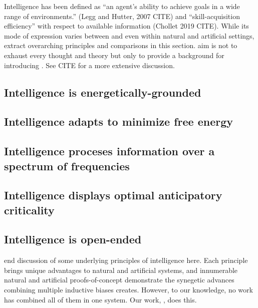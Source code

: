 Intelligence has been defined as ``an agent’s ability to achieve goals in a wide range of environments.'' (Legg and Hutter, 2007 CITE) and ``skill-acquisition efficiency'' with respect to available information (Chollet 2019 CITE). While its mode of expression varies between and even within natural and artificial settings, \we extract overarching principles and comparisons in this section. \Our aim is not to exhaust every thought and theory but only to provide a background for introducing \PGI. See CITE for a more extensive discussion.

\subsection{Intelligence is energetically-grounded}


\subsection{Intelligence adapts to minimize free energy}

    
\subsection{Intelligence proceses information over a spectrum of frequencies}


\subsection{Intelligence displays optimal anticipatory criticality}


\subsection{Intelligence is open-ended}

    
\We end \our discussion of some underlying principles of intelligence here. Each principle brings unique advantages to natural and artificial systems, and innumerable natural and artificial proofs-of-concept demonstrate the synegetic advances combining multiple inductive biases creates. However, to our knowledge, no work has combined all of them in one system. Our work, \pgi, does this. 
